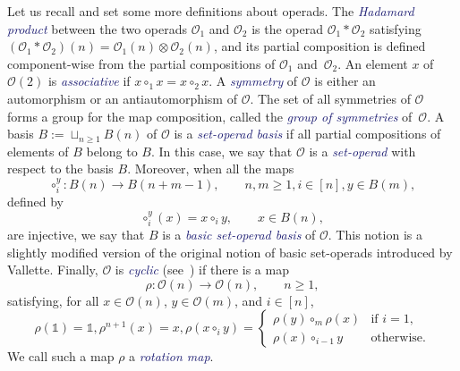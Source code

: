 \documentclass[10pt,reqno]{amsart}
\numberwithin{equation}{subsection}
\renewcommand{\geq}{\geqslant}
\newcommand{\Oca}{\mathcal{O}}
\newcommand{\Unit}{\mathds{1}}
\newcommand{\Def}[1]{\textcolor{MidnightBlue}{\em #1}}
\begin{document}
Let us recall and set some more definitions about operads. The
\Def{Hadamard product} between the two operads $\Oca_1$ and $\Oca_2$ is
the operad $\Oca_1 * \Oca_2$ satisfying
$(\Oca_1 * \Oca_2)(n) = \Oca_1(n) \otimes \Oca_2(n)$, and its partial
composition is defined component-wise from the partial compositions of
$\Oca_1$ and~$\Oca_2$. An element $x$ of $\Oca(2)$ is \Def{associative}
if $x \circ_1 x = x \circ_2 x$. A \Def{symmetry} of $\Oca$ is either an
automorphism or an antiautomorphism of $\Oca$. The set of all symmetries
of $\Oca$ forms a group for the map composition, called the \Def{group
of symmetries} of~$\Oca$. A basis $B := \sqcup_{n \geq 1} B(n)$ of
$\Oca$ is a \Def{set-operad basis} if all partial compositions of
elements of $B$ belong to $B$. In this case, we say that $\Oca$ is a
\Def{set-operad} with respect to the basis $B$. Moreover, when all the
maps
\begin{equation}
    \circ_i^y : B(n) \to B(n + m - 1),
    \qquad n, m \geq 1, i \in [n], y \in B(m),
\end{equation}
defined by
\begin{equation}
    \circ_i^y(x) = x \circ_i y,
    \qquad x \in B(n),
\end{equation}
are injective, we say that $B$ is a \Def{basic set-operad basis} of
$\Oca$. This notion is a slightly modified version of the original
notion of basic set-operads introduced by Vallette\cite{Val07}. Finally,
$\Oca$ is \Def{cyclic} (see~\cite{GK95}) if there is a map
\begin{equation} \label{equ:rotation_map_0}
    \rho : \Oca(n) \to \Oca(n), \qquad n \geq 1,
\end{equation}
satisfying, for all $x \in \Oca(n)$, $y \in \Oca(m)$, and $i \in [n]$,
\begin{subequations}
\begin{equation} \label{equ:rotation_map_1}
    \rho(\Unit) = \Unit,
\end{equation}
\begin{equation} \label{equ:rotation_map_2}
    \rho^{n + 1}(x) = x,
\end{equation}
\begin{equation} \label{equ:rotation_map_3}
    \rho(x \circ_i y) =
    \begin{cases}
        \rho(y) \circ_m \rho(x) & \mbox{if } i = 1, \\
        \rho(x) \circ_{i - 1} y & \mbox{otherwise}.
    \end{cases}
\end{equation}
\end{subequations}
We call such a map $\rho$ a \Def{rotation map}.
\medskip
\end{document}
